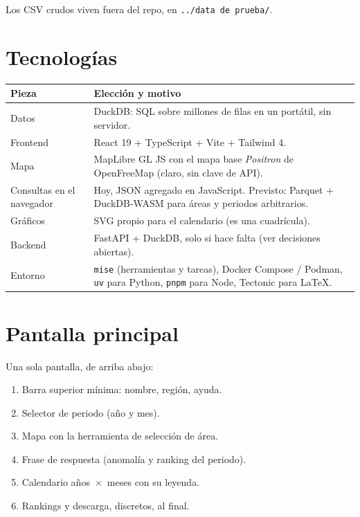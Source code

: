 Los CSV crudos viven fuera del repo, en \texttt{../data de prueba/}.

\section{Tecnologías}

\begin{tabularx}{\linewidth}{@{}lX@{}}
\toprule
Pieza & Elección y motivo \\
\midrule
Datos & DuckDB: SQL sobre millones de filas en un portátil, sin servidor. \\
Frontend & React 19 + TypeScript + Vite + Tailwind 4. \\
Mapa & MapLibre GL JS con el mapa base \emph{Positron} de OpenFreeMap (claro, sin
       clave de API). \\
Consultas en el navegador & Hoy, JSON agregado en JavaScript. Previsto: Parquet +
       DuckDB-WASM para áreas y periodos arbitrarios. \\
Gráficos & SVG propio para el calendario (es una cuadrícula). \\
Backend & FastAPI + DuckDB, solo si hace falta (ver decisiones abiertas). \\
Entorno & \texttt{mise} (herramientas y tareas), Docker Compose / Podman,
          \texttt{uv} para Python, \texttt{pnpm} para Node, Tectonic para \LaTeX. \\
\bottomrule
\end{tabularx}

\section{Pantalla principal}

Una sola pantalla, de arriba abajo:

\begin{enumerate}
  \item Barra superior mínima: nombre, región, ayuda.
  \item Selector de periodo (año y mes).
  \item Mapa con la herramienta de selección de área.
  \item Frase de respuesta (anomalía y ranking del periodo).
  \item Calendario años~$\times$~meses con su leyenda.
  \item Rankings y descarga, discretos, al final.
\end{enumerate}


